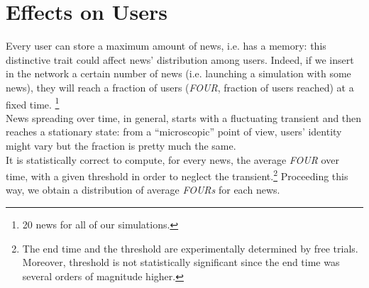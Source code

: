 \section{Effects on Users} \label{sec:users}
Every user can store a maximum amount of news, i.e. has a memory: this distinctive trait could affect news' distribution among users.
Indeed, if we insert in the network a certain number of news
(i.e. launching a simulation with some news), they will reach a
fraction of users (\textit{FOUR}, fraction of users reached)
at a fixed time.
\footnote{20 news for all of our simulations.}\\
News spreading over time, in general, starts with a fluctuating
transient and then reaches a stationary state: from a ``microscopic''
point of view, users' identity might vary but the fraction is
pretty much the same. \\
It is statistically correct to compute, for every news, the average
\textit{FOUR} over time, with a given threshold in order to
neglect the transient.\footnote{The end time and the threshold are
  experimentally determined by free trials. Moreover, threshold is
  not statistically significant since the end time was several orders of magnitude higher.}
Proceeding this way, we obtain a distribution of average \textit{FOURs}
for each news.\\

